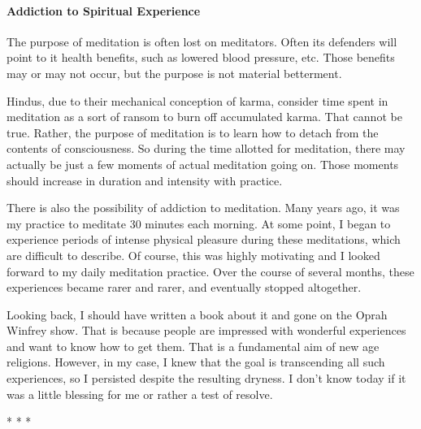 \paragraph{Addiction to Spiritual Experience}
The purpose of meditation is often lost on meditators. Often its defenders will point to it health benefits, such as lowered blood pressure, etc. Those benefits may or may not occur, but the purpose is not material betterment.

Hindus, due to their mechanical conception of karma, consider time spent in meditation as a sort of ransom to burn off accumulated karma. That cannot be true. Rather, the purpose of meditation is to learn how to detach from the contents of consciousness. So during the time allotted for meditation, there may actually be just a few moments of actual meditation going on. Those moments should increase in duration and intensity with practice.

There is also the possibility of addiction to meditation. Many years ago, it was my practice to meditate 30 minutes each morning. At some point, I began to experience periods of intense physical pleasure during these meditations, which are difficult to describe. Of course, this was highly motivating and I looked forward to my daily meditation practice. Over the course of several months, these experiences became rarer and rarer, and eventually stopped altogether.

Looking back, I should have written a book about it and gone on the Oprah Winfrey show. That is because people are impressed with wonderful experiences and want to know how to get them. That is a fundamental aim of new age religions. However, in my case, I knew that the goal is transcending all such experiences, so I persisted despite the resulting dryness. I don't know today if it was a little blessing for me or rather a test of resolve.




\begin{center}* * *\end{center}

